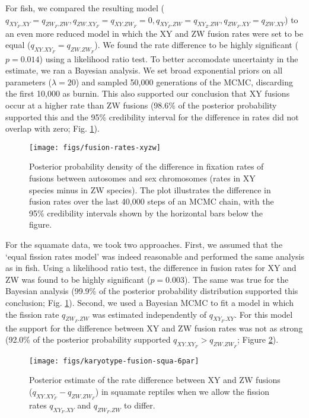 For fish, we compared the resulting model ($q_{XY_F.XY} = q_{ZW_F.ZW}, q_{ZW.XY_F}=q_{XY.ZW_F}=\text{0}, q_{XY_F.ZW}=q_{XY_Z.ZW}, q_{ZW_F.XY}=q_{ZW.XY}$) to an even more reduced model in which the XY and ZW fusion rates were set to be equal ($q_{XY.XY_F}=q_{ZW.ZW_F}$). We found the rate difference to be highly significant ($p=\text{0.014}$) using a likelihood ratio test. To better accomodate uncertainty in the estimate, we ran a Bayesian analysis. We set broad exponential priors on all parameters ($\lambda=20$) and sampled 50,000 generations of the MCMC, discarding the first 10,000 as burnin. This also supported our conclusion that XY fusions occur at a higher rate than ZW fusions (98.6\% of the posterior probability supported this and the 95\% credibility interval for the difference in rates did not overlap with zero; Fig. \ref{fig:pp-fuse-final}).

\begin{figure}
\centering
\texttt{[image: figs/fusion-rates-xyzw]}
\caption[Posterior estimate of fusion rate difference between XY and ZW systems for fish and squamates]{Posterior probability density of the difference in fixation rates of fusions between autosomes and sex chromosomes (rates in XY species minus in ZW species). The plot illustrates the difference in fusion rates over the last 40,000 steps of an MCMC chain, with the 95\% credibility intervals shown by the horizontal bars below the figure.}
\label{fig:pp-fuse-final}
\end{figure}

For the squamate data, we took two approaches. First, we assumed that the `equal fission rates model' was indeed reasonable and performed the same analysis as in fish. Using a likelihood ratio test, the difference in fusion rates for XY and ZW was found to be highly significant ($p=\text{0.003}$). The same was true for the Bayesian analysis (99.9\% of the posterior probability distribution supported this conclusion; Fig. \ref{fig:pp-fuse-final}). Second, we used a Bayesian MCMC to fit a model in which the fission rate $q_{ZW_F.ZW}$ was estimated independently of $q_{XY_F.XY}$. For this model the support for the difference between XY and ZW fusion rates was not as strong (92.0\% of the posterior probability supported $q_{XY.XY_F} > q_{ZW.ZW_F}$; Figure \ref{fig:squa-dif}).

\begin{figure}[p]
\centering
\texttt{[image: figs/karyotype-fusion-squa-6par]}
\caption[Posterior estimate of fusion rate difference between XY and ZW systems for squamates (different fission rates)]{Posterior estimate of the rate difference between XY and ZW fusions ($q_{XY.XY_F} - q_{ZW.ZW_F}$) in squamate reptiles when we allow the fission rates $q_{XY_F.XY}$ and $q_{ZW_F.ZW}$ to differ.}
\label{fig:squa-dif}
\end{figure}

